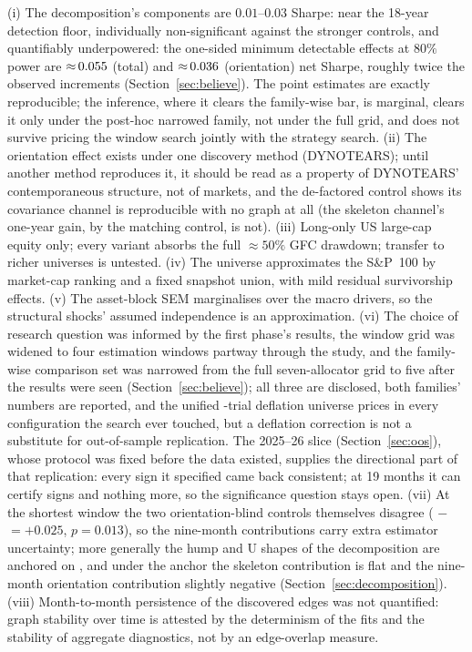 (i) The decomposition's components are
$0.01$--$0.03$ Sharpe: near the 18-year detection floor, individually
non-significant against the stronger controls, and quantifiably
underpowered: the one-sided minimum detectable effects at $80\%$ power
are ${\approx}\,0.055$ (total) and
${\approx}\,0.036$ (orientation) net Sharpe, roughly
twice the observed increments (Section~\ref{sec:believe}).
The point estimates are exactly reproducible; the inference, where it
clears the family-wise bar, is marginal, clears it only under the
post-hoc narrowed family, not under the full grid, and does not survive
pricing the window search jointly with the strategy search.
(ii) The
orientation effect exists under one discovery method (DYNOTEARS); until
another method reproduces it, it should be read as a property of DYNOTEARS'
contemporaneous structure, not of markets, and the de-factored control
shows its covariance channel is reproducible with no graph at all
(the skeleton channel's one-year gain, by the matching control, is
not). (iii) Long-only US
large-cap equity only; every variant absorbs the full ${\approx}50\%$ GFC
drawdown; transfer to richer universes is untested. (iv) The
universe approximates the S\&P~100 by market-cap ranking and a fixed
snapshot union, with mild residual survivorship effects. (v) The
asset-block SEM marginalises over the macro drivers, so the structural
shocks' assumed independence is an approximation. (vi) The choice
of research question was informed by the first phase's
results, the window grid was widened to four estimation windows partway through
the study, and the family-wise comparison set was narrowed from the
full seven-allocator grid to five after the results were seen
(Section~\ref{sec:believe}); all three are disclosed, both families'
numbers are reported, and the unified
\rsNtrials-trial deflation universe prices in every configuration the
search ever touched, but a deflation correction is not a substitute for
out-of-sample replication. The 2025--26 slice
(Section~\ref{sec:oos}), whose protocol was fixed before the data
existed, supplies the directional part of that
replication: every sign it specified came back
consistent; at 19 months
it can certify signs and nothing more, so the significance question
stays open. (vii) At the shortest window the two
orientation-blind controls themselves disagree (\skelalt{} $-$ \skelsamp{} $= +0.025$,
$p=0.013$), so the nine-month contributions carry extra estimator
uncertainty;
more generally the hump and U shapes of the decomposition are anchored on
\skelsamp{}, and under the \skelalt{} anchor the skeleton contribution is
flat
and the nine-month orientation contribution slightly negative
(Section~\ref{sec:decomposition}). (viii) Month-to-month
persistence of the discovered edges was not quantified: graph stability
over time is attested by the determinism of the fits and the stability of
aggregate diagnostics, not by an edge-overlap measure.

